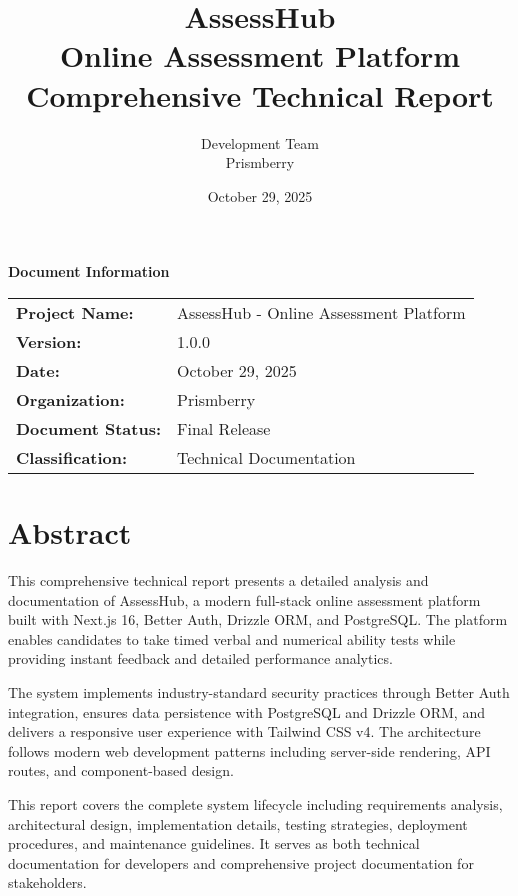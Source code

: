 \documentclass[12pt,a4paper]{report}
\title{
    \vspace{-2cm}
    \Huge\textbf{\color{primarycolor}AssessHub} \\
    \vspace{0.5cm}
    \Large Online Assessment Platform \\
    \vspace{0.3cm}
    \large Comprehensive Technical Report
}
\author{Development Team \\ Prismberry}
\date{October 29, 2025}
\begin{document}
\maketitle
\thispagestyle{empty}

\vfill
\begin{center}
\large
\textbf{Document Information}

\vspace{1cm}
\begin{tabular}{ll}
\textbf{Project Name:} & AssessHub - Online Assessment Platform \\
\textbf{Version:} & 1.0.0 \\
\textbf{Date:} & October 29, 2025 \\
\textbf{Organization:} & Prismberry \\
\textbf{Document Status:} & Final Release \\
\textbf{Classification:} & Technical Documentation \\
\end{tabular}
\end{center}
\vfill

\newpage

\chapter*{Abstract}

This comprehensive technical report presents a detailed analysis and documentation of AssessHub, a modern full-stack online assessment platform built with Next.js 16, Better Auth, Drizzle ORM, and PostgreSQL. The platform enables candidates to take timed verbal and numerical ability tests while providing instant feedback and detailed performance analytics.

The system implements industry-standard security practices through Better Auth integration, ensures data persistence with PostgreSQL and Drizzle ORM, and delivers a responsive user experience with Tailwind CSS v4. The architecture follows modern web development patterns including server-side rendering, API routes, and component-based design.

This report covers the complete system lifecycle including requirements analysis, architectural design, implementation details, testing strategies, deployment procedures, and maintenance guidelines. It serves as both technical documentation for developers and comprehensive project documentation for stakeholders.
\end{document}
